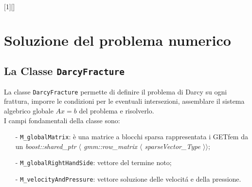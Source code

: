[1][]{}{}

\chapter{Soluzione del problema numerico}

\section{La Classe \texttt{DarcyFracture}}
La classe \texttt{DarcyFracture} permette di definire il problema di Darcy su ogni frattura, imporre le condizioni per le eventuali intersezioni, assemblare il sistema algebrico globale $ Ax=b $ del problema e risolverlo.\\

\noindent I campi fondamentali della classe sono:
	\begin{enumerate}
	\item[-] \texttt{M\_globalMatrix}: \`{e} una matrice a blocchi sparsa rappresentata i GETfem da un \textit{boost::shared\_ptr $\langle$ gmm::row\_matrix $\langle$ sparseVector\_Type $\rangle \rangle$};
	\item[-] \texttt{M\_globalRightHandSide}: vettore del termine noto;
	\item[-] \texttt{M\_velocityAndPressure}: vettore soluzione delle velocit\'{a} e della pressione.
	\end{enumerate} 

